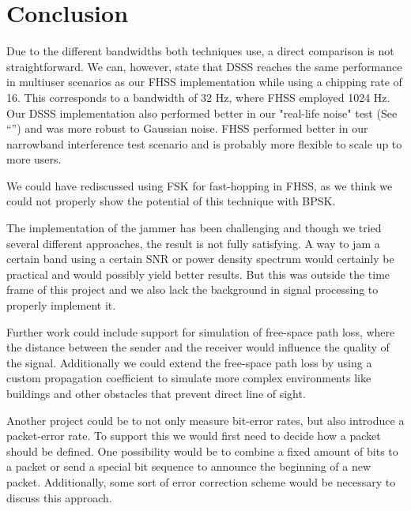\section{Conclusion}
	Due to the different bandwidths both techniques use, a direct comparison is not straightforward.
    We can, however, state that DSSS reaches the same performance in multiuser scenarios as our FHSS implementation while using a chipping rate of 16. This corresponds to a bandwidth of 32 Hz, where FHSS employed 1024 Hz.
    Our DSSS implementation also performed better in our "real-life noise" test (See ``'') and was more robust to Gaussian noise.
    FHSS performed better in our narrowband interference test scenario and is probably more flexible to scale up to more users.
    
    We could have rediscussed using FSK for fast-hopping in FHSS, as we think we could not properly show the potential of this technique with BPSK.
    
    The implementation of the jammer has been challenging and though we tried several different approaches, the result is not fully satisfying.
    A way to jam a certain band using a certain SNR or power density spectrum would certainly be practical and would possibly yield better results.
    But this was outside the time frame of this project and we also lack the background in signal processing to properly implement it.
    
    Further work could include support for simulation of free-space path loss, where the distance between the sender and the receiver would influence the quality of the signal.
    Additionally we could extend the free-space path loss by using a custom propagation coefficient to simulate more complex environments like buildings and other obstacles that prevent direct line of sight.
    
    Another project could be to not only measure bit-error rates, but also introduce a packet-error rate.
    To support this we would first need to decide how a packet should be defined.
    One possibility would be to combine a fixed amount of bits to a packet or send a special bit sequence to announce the beginning of a new packet.
    Additionally, some sort of error correction scheme would be necessary to discuss this approach.